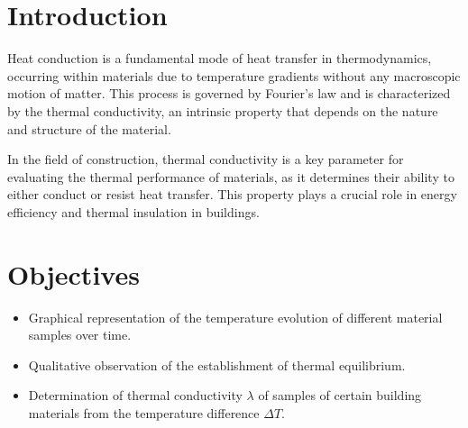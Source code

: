 \documentclass[12pt,a4paper,twoside]{article}
\begin{document}
\pagestyle{plain}


\begin{abstract}

\textit{This report investigates heat conduction in three different construction materials (\textbf{Wood, Fermacell, and Rohacell}) using the plate method with the Cassy system. The thermal conductivity is determined from measurements of electrical power and temperature difference across the samples. The experimental results are compared with literature values in order to assess their accuracy and discuss possible sources of error. In addition, a Python-based simulation is used to illustrate the temporal evolution of temperature and its consistency with Fourier’s law. An open-source repository is provided to ensure transparency and reproducibility.}

\end{abstract}

\tableofcontents

\listoffigures

\listoftables

\newpage 

\pagestyle{fancy} 

\setcounter{page}{1}    



\section{Introduction}

Heat conduction is a fundamental mode of heat transfer in thermodynamics, occurring within materials due to temperature gradients without any macroscopic motion of matter. This process is governed by Fourier’s law and is characterized by the thermal conductivity, an intrinsic property that depends on the nature and structure of the material.

In the field of construction, thermal conductivity is a key parameter for evaluating the thermal performance of materials, as it determines their ability to either conduct or resist heat transfer. This property plays a crucial role in energy efficiency and thermal insulation in buildings.


\section{Objectives}
\begin{itemize}
    \item Graphical representation of the temperature evolution of different material samples over time.
    \item Qualitative observation of the establishment of thermal equilibrium.
    \item Determination of thermal conductivity $\lambda$ of samples of certain building materials from the temperature difference $\Delta T$.
\end{itemize}
\end{document}
